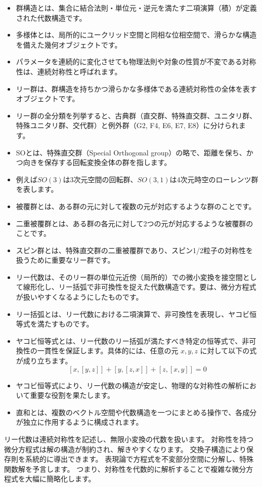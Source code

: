 \documentclass[a4paper,12pt,notitlepage]{jsreport}
\begin{document}
\begin{itemize}
  \item 群構造とは、集合に結合法則・単位元・逆元を満たす二項演算（積）が定義された代数構造です。
  \item 多様体とは、局所的にユークリッド空間と同相な位相空間で、滑らかな構造を備えた幾何オブジェクトです。
  \item パラメータを連続的に変化させても物理法則や対象の性質が不変である対称性は、連続対称性と呼ばれます。
  \item リー群は、群構造を持ちかつ滑らかな多様体である連続対称性の全体を表すオブジェクトです。
  \item リー群の全分類を列挙すると、古典群（直交群、特殊直交群、ユニタリ群、特殊ユニタリ群、交代群）と例外群（G2, F4, E6, E7, E8）に分けられます。
  \item SOとは、特殊直交群（Special Orthogonal group）の略で、距離を保ち、かつ向きを保存する回転変換全体の群を指します。
  \item 例えば$ SO(3) $は3次元空間の回転群、$ SO(3,1) $は4次元時空のローレンツ群を表します。
  \item 被覆群とは、ある群の元に対して複数の元が対応するような群のことです。
  \item 二重被覆群とは、ある群の各元に対して2つの元が対応するような被覆群のことです。
  \item スピン群とは、特殊直交群の二重被覆群であり、スピン1/2粒子の対称性を扱うために重要なリー群です。
  \item リー代数は、そのリー群の単位元近傍（局所的）での微小変換を接空間として線形化し、リー括弧で非可換性を捉えた代数構造です。要は、微分方程式が扱いやすくなるようにしたものです。
  \item リー括弧とは、リー代数における二項演算で、非可換性を表現し、ヤコビ恒等式を満たすものです。
  \item ヤコビ恒等式とは、リー代数のリー括弧が満たすべき特定の恒等式で、非可換性の一貫性を保証します。具体的には、任意の元 $ x, y, z $ に対して以下の式が成り立ちます。
  \[ [x,[y,z]] + [y,[z,x]] + [z,[x,y]] = 0 \]
  \item ヤコビ恒等式により、リー代数の構造が安定し、物理的な対称性の解析において重要な役割を果たします。
  \item 直和とは、複数のベクトル空間や代数構造を一つにまとめる操作で、各成分が独立に作用するように構成されます。
\end{itemize}

リー代数は連続対称性を記述し、無限小変換の代数を扱います。
対称性を持つ微分方程式は解の構造が制約され、解きやすくなります。
交換子構造により保存則を系統的に導出できます。
表現論で方程式を不変部分空間に分解し、特殊関数解を予言します。
つまり、対称性を代数的に解析することで複雑な微分方程式を大幅に簡略化します。
\end{document}
